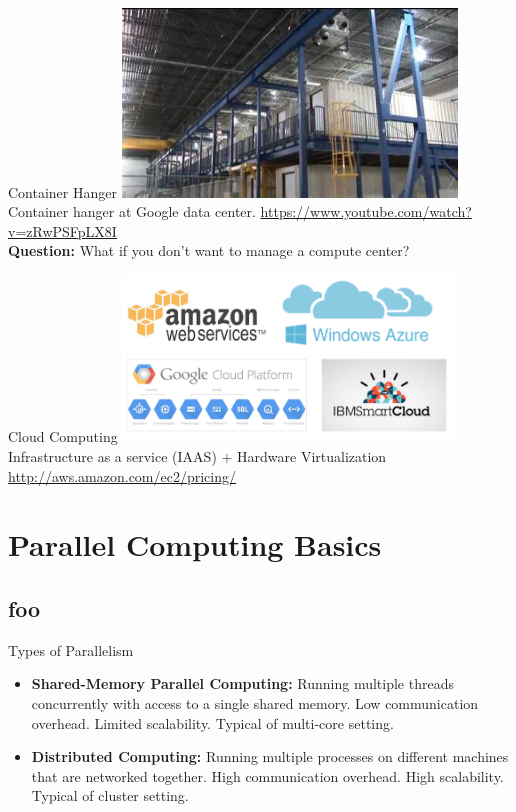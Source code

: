 \documentclass[serif,xcolor=pdftex,dvipsnames,table,hyperref={bookmarks=false,breaklinks}]{beamer}
\begin{document}
\begin{frame}[t]{Container Hanger}
\center
\includegraphics[width=3.5in]{../Figures/server_container.jpg}\\
Container hanger at Google data center.
{\footnotesize\url{https://www.youtube.com/watch?v=zRwPSFpLX8I}}\\
\pause\textbf{Question:} What if you don't want to manage a compute 
center?
\end{frame}

\begin{frame}[t]{Cloud Computing}
\center
\includegraphics[width=3.5in]{../Figures/clouds.png}\\[12pt]

Infrastructure as a service (IAAS) + Hardware Virtualization \\[12pt]
\url{http://aws.amazon.com/ec2/pricing/}

\end{frame}

\section{Parallel Computing Basics}
\subsection{foo}

\begin{frame}[t]{Types of Parallelism}
\begin{itemize}
\item \textbf{Shared-Memory Parallel Computing:} Running multiple threads 
concurrently with access to a single shared memory.  Low communication overhead. 
Limited scalability. Typical of multi-core 
setting.

\pause \item \textbf{Distributed Computing:} Running multiple processes on 
different machines that are networked together. High communication overhead. 
High scalability. Typical of cluster setting.
\end{itemize}
\end{frame}
\end{document}
